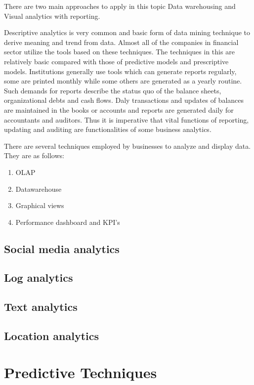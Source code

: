 There are two main approaches to apply in this topic Data warehousing and Visual analytics with reporting.

Descriptive analytics is very common and basic form of data mining technique to derive meaning and trend from data. Almost all of the companies in financial sector utilize the tools based on these techniques. The techniques in this are relatively basic compared with those of predictive models and prescriptive models. Institutions generally use tools which can generate reports regularly, some are printed monthly while some others are generated  as a yearly routine. Such demands for reports describe the status quo of the balance sheets, organizational debts and cash flows. Daly transactions and updates of balances are maintained in the books or accounts and reports are generated daily for accountants and auditors. Thus it is imperative that vital functions of reporting, updating and auditing are functionalities of some business analytics.

There are several techniques employed by businesses to analyze and display data. They are as follows:
\begin{enumerate}
	\item OLAP
	\item Datawarehouse
	\item Graphical views
	\item Performance dashboard and KPI's
\end{enumerate}

\section{Social media analytics}
\section{Log analytics}
\section{Text analytics}
\section{Location analytics}



%
%
%
%

\setlength{\footskip}{8mm}

\chapter{Predictive Techniques} 
\label{predictive-techniques}

